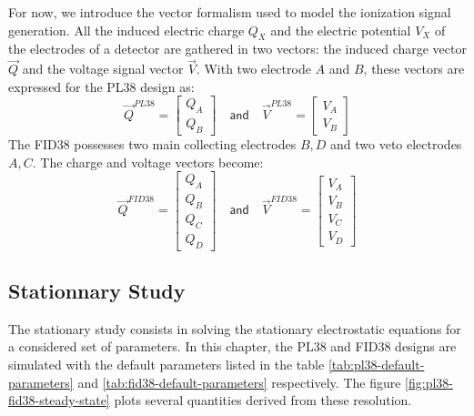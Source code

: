 For now, we introduce the vector formalism used to model the ionization signal generation. All the induced electric charge $Q_X$ and the electric potential $V_X$ of the electrodes of a detector are gathered in two vectors: the induced charge vector $\vec{Q}$ and the voltage signal vector $\vec{V}$. With two electrode $A$ and $B$, these vectors are expressed for the PL38 design as:
\begin{equation}
\vec{Q}^{PL38} =
\begin{bmatrix}
Q_{A} \\ Q_{B}
\end{bmatrix}
\quad
\textsf{and}
\quad
\vec{V}^{PL38} =
\begin{bmatrix}
V_{A} \\ V_{B}
\end{bmatrix}
\end{equation}
The FID38 possesses two main collecting electrodes $B, D$ and two veto electrodes $A, C$. The charge and voltage vectors become:
\begin{equation}
\vec{Q}^{FID38} =
\begin{bmatrix}
Q_{A} \\ Q_{B} \\ Q_{C} \\ Q_{D}
\end{bmatrix}
\quad
\textsf{and}
\quad
\vec{V}^{FID38} =
\begin{bmatrix}
V_{A} \\ V_{B} \\ V_{C} \\ V_{D}
\end{bmatrix}
\end{equation}


\subsection{Stationnary Study}
\label{par:stationnary-study}
\label{par:fiducial-volume}

The stationary study consists in solving the stationary electrostatic equations for a considered set of parameters. In this chapter, the PL38 and FID38 designs are simulated with the default parameters listed in the table \ref{tab:pl38-default-parameters} and \ref{tab:fid38-default-parameters} respectively. The figure \ref{fig:pl38-fid38-steady-state} plots several quantities derived from these resolution.


